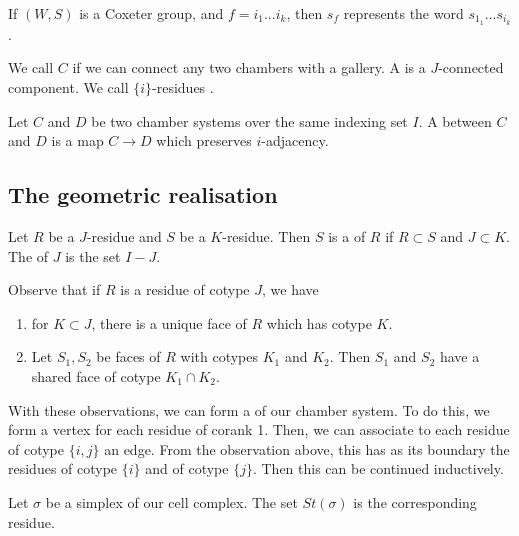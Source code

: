 \documentclass[11pt]{article}
\begin{document}
\begin{definition}
    If $(W,S)$ is a Coxeter group, and $f=i_1...i_k$, then $s_f$ represents the word $s_{1_1}...s_{i_k}$. 
\end{definition}

\begin{definition}
    We call $C$  if we can connect any two chambers with a gallery. A  is a $J$-connected component. We call $\{i\}$-residues . 
\end{definition}


\begin{definition}
    Let $C$ and $D$ be two chamber systems over the same indexing set $I$. A  between $C$ and $D$ is a map $C\to D$ which preserves $i$-adjacency.
\end{definition}

\subsection{The geometric realisation}

\begin{definition}
    Let $R$ be a $J$-residue and $S$ be a $K$-residue. Then $S$ is a  of $R$ if $R\subset S$ and $J\subset K$. The  of $J$ is the set $I-J$. 
\end{definition}


Observe that if $R$ is a residue of cotype $J$, we have
\begin{enumerate}
    \item for $K\subset J$, there is a unique face of $R$ which has cotype $K$.
    \item Let $S_1,S_2$ be faces of $R$ with cotypes $K_1$ and $K_2$. Then $S_1$ and $S_2$ have a shared face of cotype $K_1\cap K_2$. 
\end{enumerate}


With these observations, we can form a  of our chamber system. To do this, we form a vertex for each residue of corank 1. Then, we can associate to each residue of cotype $\{i,j\}$ an edge. From the observation above, this has as its boundary the residues of cotype $\{i\}$ and of cotype $\{j\}$. Then this can be continued inductively. 

\begin{definition}
    Let $\sigma$ be a simplex of our cell complex. The set  $St(\sigma)$ is the corresponding residue. 
\end{definition}
\end{document}
